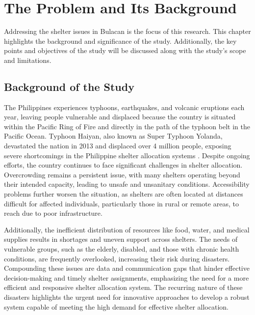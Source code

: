\chapter{The Problem and Its Background}

	Addressing the shelter issues in Bulacan is the focus of this research. This chapter highlights the background and significance of the study. Additionally, the key points and objectives of the study will be discussed along with the study's scope and limitations.

\section{Background of the Study}

	The Philippines experiences typhoons, earthquakes, and volcanic eruptions each year, leaving people vulnerable and displaced because the country is situated within the Pacific Ring of Fire and directly in the path of the typhoon belt in the Pacific Ocean. Typhoon Haiyan, also known as Super Typhoon Yolanda, devastated the nation in 2013 and displaced over 4 million people, exposing severe shortcomings in the Philippine shelter allocation systems \parencite{Iuchi2019}. Despite ongoing efforts, the country continues to face significant challenges in shelter allocation. Overcrowding remains a persistent issue, with many shelters operating beyond their intended capacity, leading to unsafe and unsanitary conditions. Accessibility problems further worsen the situation, as shelters are often located at distances difficult for affected individuals, particularly those in rural or remote areas, to reach due to poor infrastructure.
	
	Additionally, the inefficient distribution of resources like food, water, and medical supplies results in shortages and uneven support across shelters. The needs of vulnerable groups, such as the elderly, disabled, and those with chronic health conditions, are frequently overlooked, increasing their risk during disasters. Compounding these issues are data and communication gaps that hinder effective decision-making and timely shelter assignments, emphasizing the need for a more efficient and responsive shelter allocation system. The recurring nature of these disasters highlights the urgent need for innovative approaches to develop a robust system capable of meeting the high demand for effective shelter allocation.
	
